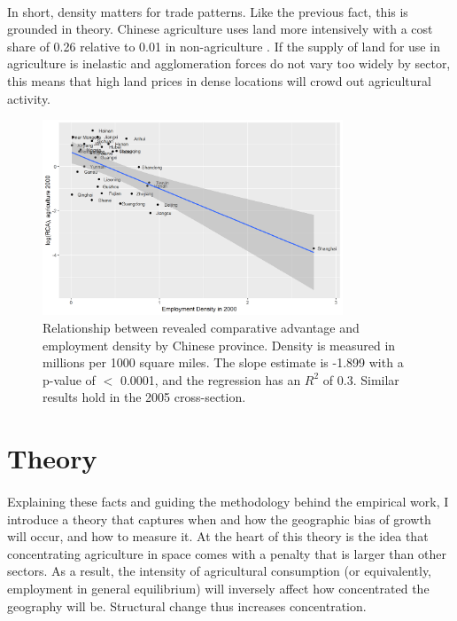 \documentclass[]{article}
\theoremstyle{plain}
\begin{document}
\paragraph*{}
In short, density matters for trade patterns. Like the previous fact, this is grounded in theory. Chinese agriculture uses land more intensively with a cost share of 0.26 relative to 0.01 in non-agriculture \citep{hao2020}. If the supply of land for use in agriculture is inelastic and agglomeration forces do not vary too widely by sector, this means that high land prices in dense locations will crowd out agricultural activity.
\begin{center}
	\begin{figure}[h]
		\centering
		\includegraphics[width=0.8\textwidth]{figRCA.png}
		\caption{Relationship between revealed comparative advantage and employment density by Chinese province. Density is measured in millions per 1000 square miles. The slope estimate is -1.899 with a p-value of $<$ 0.0001, and the regression has an $R^{2}$ of 0.3. Similar results hold in the 2005 cross-section. }
		\label{fig:RCA}
	\end{figure}
\end{center}

\section{Theory}\label{section:theory}
\paragraph*{}
Explaining these facts and guiding the methodology behind the empirical work, I introduce a theory that captures when and how the geographic bias of growth will occur, and how to measure it. At the heart of this theory is the idea that concentrating agriculture in space comes with a penalty that is larger than other sectors. As a result, the intensity of agricultural consumption (or equivalently, employment in general equilibrium) will inversely affect how concentrated the geography will be. Structural change thus increases concentration. 
\end{document}
